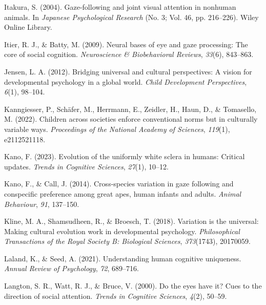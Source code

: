 \documentclass[
  man,floatsintext]{apa7}
\newlength{\cslhangindent}
\newlength{\cslentryspacingunit} %
\newenvironment{CSLReferences}[2] %
 {%
  \setlength{\parindent}{0pt}
  \ifodd #1
  \let\oldpar\par
  \def\par{\hangindent=\cslhangindent\oldpar}
  \fi
  \setlength{\parskip}{#2\cslentryspacingunit}
 }%
 {}
\begin{document}
\begin{CSLReferences}{1}{0}
\leavevmode{}%
Itakura, S. (2004). Gaze-following and joint visual attention in nonhuman animals. In \emph{Japanese Psychological Research} (No. 3; Vol. 46, pp. 216--226). Wiley Online Library.

\leavevmode{}%
Itier, R. J., \& Batty, M. (2009). Neural bases of eye and gaze processing: The core of social cognition. \emph{Neuroscience \& Biobehavioral Reviews}, \emph{33}(6), 843--863.

\leavevmode{}%
Jensen, L. A. (2012). Bridging universal and cultural perspectives: A vision for developmental psychology in a global world. \emph{Child Development Perspectives}, \emph{6}(1), 98--104.

\leavevmode{}%
Kanngiesser, P., Schäfer, M., Herrmann, E., Zeidler, H., Haun, D., \& Tomasello, M. (2022). Children across societies enforce conventional norms but in culturally variable ways. \emph{Proceedings of the National Academy of Sciences}, \emph{119}(1), e2112521118.

\leavevmode{}%
Kano, F. (2023). Evolution of the uniformly white sclera in humans: Critical updates. \emph{Trends in Cognitive Sciences}, \emph{27}(1), 10--12.

\leavevmode{}%
Kano, F., \& Call, J. (2014). Cross-species variation in gaze following and conspecific preference among great apes, human infants and adults. \emph{Animal Behaviour}, \emph{91}, 137--150.

\leavevmode{}%
Kline, M. A., Shamsudheen, R., \& Broesch, T. (2018). Variation is the universal: Making cultural evolution work in developmental psychology. \emph{Philosophical Transactions of the Royal Society B: Biological Sciences}, \emph{373}(1743), 20170059.

\leavevmode{}%
Laland, K., \& Seed, A. (2021). Understanding human cognitive uniqueness. \emph{Annual Review of Psychology}, \emph{72}, 689--716.

\leavevmode{}%
Langton, S. R., Watt, R. J., \& Bruce, V. (2000). Do the eyes have it? Cues to the direction of social attention. \emph{Trends in Cognitive Sciences}, \emph{4}(2), 50--59.


\end{CSLReferences}
\end{document}
